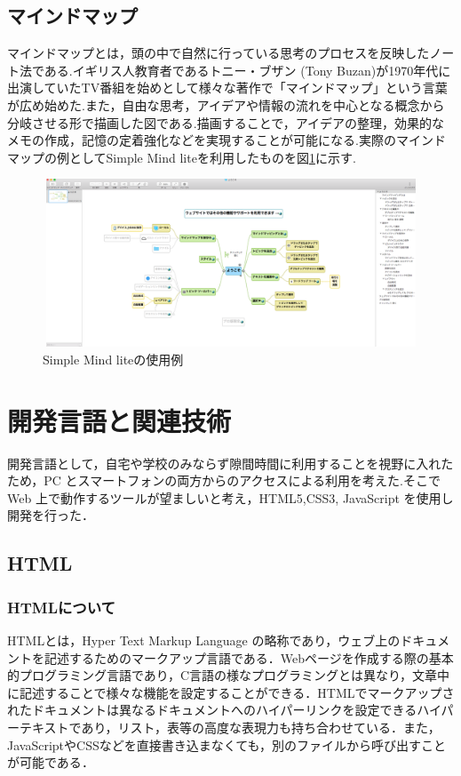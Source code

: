 \documentclass[a4j,12pt]{jarticle}
\begin{document}
\newpage
\subsection{マインドマップ}
マインドマップとは，頭の中で自然に行っている思考のプロセスを反映したノート法である.イギリス人教育者であるトニー・ブザン (Tony Buzan)が1970年代に出演していたTV番組を始めとして様々な著作で「マインドマップ」という言葉が広め始めた\cite{ren4}.また，自由な思考，アイデアや情報の流れを中心となる概念から分岐させる形で描画した図である.描画することで，アイデアの整理，効果的なメモの作成，記憶の定着強化などを実現することが可能になる.実際のマインドマップの例としてSimple Mind liteを利用したものを図\ref{fig:e}に示す.
\begin{figure}[h]
\begin{center}
 \includegraphics[clip,width=130mm,height=50mm]{figure/maindmap.png}
\end{center}
 \caption{Simple Mind liteの使用例}
 \label{fig:e}
\end{figure}
\newpage

\newpage
\section{開発言語と関連技術}
開発言語として，自宅や学校のみならず隙間時間に利用することを視野に入れたため，PC とスマートフォンの両方からのアクセスによる利用を考えた.そこで Web 上で動作するツールが望ましいと考え，HTML5,CSS3, JavaScript を使用し開発を行った．
\subsection{HTML}
\subsubsection{HTMLについて}
HTMLとは，Hyper Text Markup Language の略称であり，ウェブ上のドキュメントを記述するためのマークアップ言語である．Webページを作成する際の基本的プログラミング言語であり，C言語の様なプログラミングとは異なり，文章中に記述することで様々な機能を設定することができる．HTMLでマークアップされたドキュメントは異なるドキュメントへのハイパーリンクを設定できるハイパーテキストであり，リスト，表等の高度な表現力も持ち合わせている．また，JavaScriptやCSSなどを直接書き込まなくても，別のファイルから呼び出すことが可能である\cite{ren8}．
\end{document}

